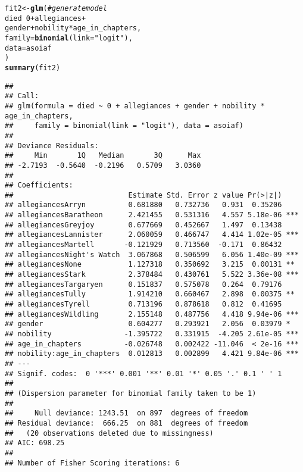 \documentclass{article}\usepackage[]{graphicx}\usepackage[]{color}
\makeatletter
\newcommand{\hlnum}[1]{\textcolor[rgb]{0.686,0.059,0.569}{#1}}%
\newcommand{\hlstr}[1]{\textcolor[rgb]{0.192,0.494,0.8}{#1}}%
\newcommand{\hlcom}[1]{\textcolor[rgb]{0.678,0.584,0.686}{\textit{#1}}}%
\newcommand{\hlopt}[1]{\textcolor[rgb]{0,0,0}{#1}}%
\newcommand{\hlstd}[1]{\textcolor[rgb]{0.345,0.345,0.345}{#1}}%
\newcommand{\hlkwb}[1]{\textcolor[rgb]{0.69,0.353,0.396}{#1}}%
\newcommand{\hlkwc}[1]{\textcolor[rgb]{0.333,0.667,0.333}{#1}}%
\newcommand{\hlkwd}[1]{\textcolor[rgb]{0.737,0.353,0.396}{\textbf{#1}}}%
\newenvironment{kframe}{%
 \def\at@end@of@kframe{}%
 \ifinner\ifhmode%
  \def\at@end@of@kframe{\end{minipage}}%
  \begin{minipage}{\columnwidth}%
 \fi\fi%
 \def\FrameCommand##1{\hskip\@totalleftmargin \hskip-\fboxsep
 \colorbox{shadecolor}{##1}\hskip-\fboxsep
     \hskip-\linewidth \hskip-\@totalleftmargin \hskip\columnwidth}%
 \MakeFramed {\advance\hsize-\width
   \@totalleftmargin\z@ \linewidth\hsize
   \@setminipage}}%
 {\par\unskip\endMakeFramed%
 \at@end@of@kframe}
\newenvironment{knitrout}{}{} %
\makeatother
\begin{document}
\begin{knitrout}
\color{fgcolor}\begin{kframe}
\begin{alltt}
\hlstd{fit2} \hlkwb{<-} \hlkwd{glm}\hlstd{(} \hlcom{# generate model}
  \hlstd{died} \hlopt{~} \hlnum{0} \hlopt{+} \hlstd{allegiances} \hlopt{+}
    \hlstd{gender} \hlopt{+} \hlstd{nobility} \hlopt{*} \hlstd{age_in_chapters,}
  \hlkwc{family} \hlstd{=} \hlkwd{binomial}\hlstd{(}\hlkwc{link} \hlstd{=} \hlstr{"logit"}\hlstd{),}
  \hlkwc{data} \hlstd{= asoiaf}
\hlstd{)}
\hlkwd{summary}\hlstd{(fit2)}
\end{alltt}
\begin{verbatim}
## 
## Call:
## glm(formula = died ~ 0 + allegiances + gender + nobility * age_in_chapters, 
##     family = binomial(link = "logit"), data = asoiaf)
## 
## Deviance Residuals: 
##     Min       1Q   Median       3Q      Max  
## -2.7193  -0.5640  -0.2196   0.5709   3.0360  
## 
## Coefficients:
##                           Estimate Std. Error z value Pr(>|z|)    
## allegiancesArryn          0.681880   0.732736   0.931  0.35206    
## allegiancesBaratheon      2.421455   0.531316   4.557 5.18e-06 ***
## allegiancesGreyjoy        0.677669   0.452667   1.497  0.13438    
## allegiancesLannister      2.060059   0.466747   4.414 1.02e-05 ***
## allegiancesMartell       -0.121929   0.713560  -0.171  0.86432    
## allegiancesNight's Watch  3.067868   0.506599   6.056 1.40e-09 ***
## allegiancesNone           1.127318   0.350692   3.215  0.00131 ** 
## allegiancesStark          2.378484   0.430761   5.522 3.36e-08 ***
## allegiancesTargaryen      0.151837   0.575078   0.264  0.79176    
## allegiancesTully          1.914210   0.660467   2.898  0.00375 ** 
## allegiancesTyrell         0.713196   0.878618   0.812  0.41695    
## allegiancesWildling       2.155148   0.487756   4.418 9.94e-06 ***
## gender                    0.604277   0.293921   2.056  0.03979 *  
## nobility                 -1.395722   0.331915  -4.205 2.61e-05 ***
## age_in_chapters          -0.026748   0.002422 -11.046  < 2e-16 ***
## nobility:age_in_chapters  0.012813   0.002899   4.421 9.84e-06 ***
## ---
## Signif. codes:  0 '***' 0.001 '**' 0.01 '*' 0.05 '.' 0.1 ' ' 1
## 
## (Dispersion parameter for binomial family taken to be 1)
## 
##     Null deviance: 1243.51  on 897  degrees of freedom
## Residual deviance:  666.25  on 881  degrees of freedom
##   (20 observations deleted due to missingness)
## AIC: 698.25
## 
## Number of Fisher Scoring iterations: 6
\end{verbatim}
\end{kframe}
\end{knitrout}
\end{document}
